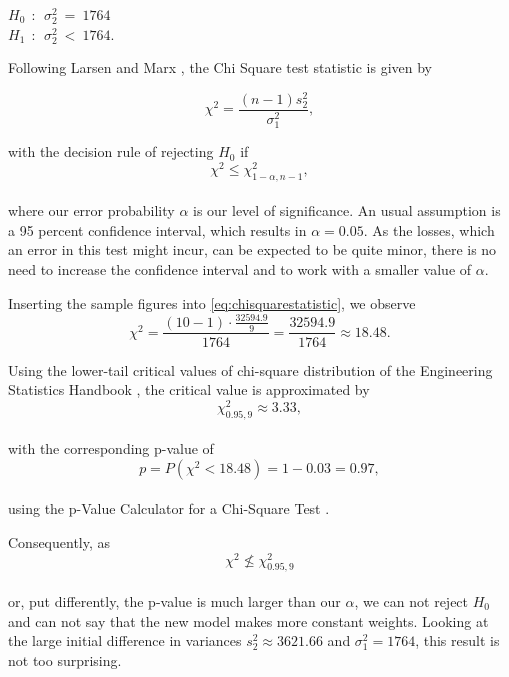 \begin{center}
$H_0~~:~~ \sigma^2_2~=~1764$\\ 
$H_1~~:~~ \sigma^2_2~<~1764$.
\end{center}

Following Larsen and Marx \cite[Chapter 7.5]{larsen2005introduction}, the Chi Square test statistic is given by 

\begin{equation}
\chi^2 = \frac{(n-1)s_2^2}{\sigma_1^2},
\label{eq:chisquarestatistic}
\end{equation}

with the decision rule of rejecting $H_0$ if 
\\
\begin{equation}
\chi^2 \leq \chi^2_{1-\alpha,n-1},
\label{eq:decisionrule}
\end{equation}
\\
where our error probability $\alpha$ is our level of significance. An usual assumption is a 95 percent confidence interval, which results in $\alpha = 0.05$. As the losses, which an error in this test might incur, can be expected to be quite minor, there is no need to increase the confidence interval and to work with a smaller value of $\alpha$.


Inserting the sample figures into \eqref{eq:chisquarestatistic}, we observe 
\begin{equation}
\chi^2 = \frac{(10-1) \cdot \frac{32594.9}{9}}{1764} = \frac{32594.9}{1764} \approx 18.48.
\label{eq:chisqstatcalc}
\end{equation}

Using the lower-tail critical values of chi-square distribution of the Engineering Statistics Handbook \cite{nist}, the critical value is approximated by 
\\
\begin{equation}
\chi^2_{0.95,9}\approx 3.33,
\label{eq:criticalvalue}
\end{equation}
\\
with the corresponding p-value of
\\
\begin{equation}
p = P(\chi^2 < 18.48) = 1-0.03 = 0.97,
\label{eq:pvalue}
\end{equation}
\\
using the p-Value Calculator for a Chi-Square Test \cite{freepvalue}. 

Consequently, as 
\\
\begin{equation}
\chi^2 \nleq \chi^2_{0.95,9}
\label{eq:criticalvalue}
\end{equation}
\\
or, put differently, the p-value is much larger than our $\alpha$, we can not reject $H_0$ and can not say that the new model makes more constant weights. Looking at the large initial difference in variances $s_2^2 \approx 3621.66 $ and $\sigma^2_1 = 1764$, this result is not too surprising. 



